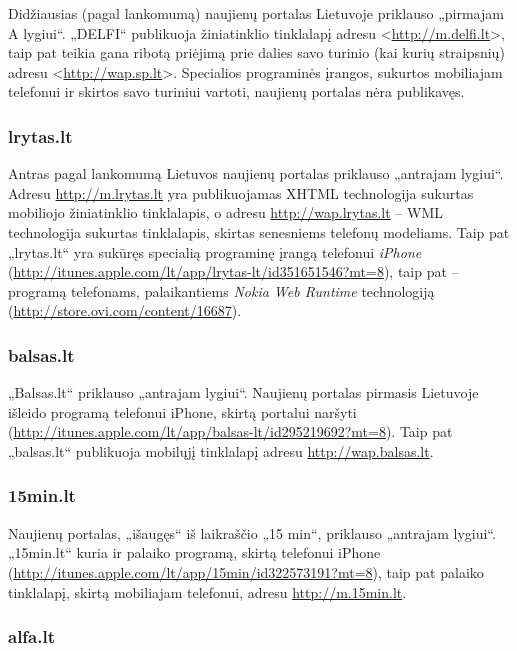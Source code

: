 \documentclass[kursinis-darbas]{vukf}
\begin{document}
Didžiausias (pagal lankomumą) naujienų portalas Lietuvoje priklauso „pirmajam A lygiui“. „DELFI“ publikuoja žiniatinklio tinklalapį adresu <\url{http://m.delfi.lt}>, taip pat teikia gana ribotą priėjimą prie dalies savo turinio (kai kurių straipsnių) adresu <\url{http://wap.sp.lt}>. Specialios programinės įrangos, sukurtos mobiliajam telefonui ir skirtos savo turiniui vartoti, naujienų portalas nėra publikavęs.

\subsubsection{lrytas.lt}

Antras pagal lankomumą Lietuvos naujienų portalas priklauso „antrajam lygiui“. Adresu \url{http://m.lrytas.lt} yra publikuojamas XHTML technologija sukurtas mobiliojo žiniatinklio tinklalapis, o adresu \url{http://wap.lrytas.lt} – WML technologija sukurtas tinklalapis, skirtas senesniems telefonų modeliams. Taip pat „lrytas.lt“ yra sukūręs specialią programinę įrangą telefonui \emph{iPhone} (\url{http://itunes.apple.com/lt/app/lrytas-lt/id351651546?mt=8}), taip pat – programą telefonams, palaikantiems \emph{Nokia Web Runtime} technologiją (\url{http://store.ovi.com/content/16687}).

\subsubsection{balsas.lt}

„Balsas.lt“ priklauso „antrajam lygiui“. Naujienų portalas pirmasis Lietuvoje išleido programą telefonui iPhone, skirtą portalui naršyti (\url{http://itunes.apple.com/lt/app/balsas-lt/id295219692?mt=8}). Taip pat „balsas.lt“ publikuoja mobilųjį tinklalapį adresu \url{http://wap.balsas.lt}.

\subsubsection{15min.lt}

Naujienų portalas, „išaugęs“ iš laikraščio „15 min“, priklauso „antrajam lygiui“. „15min.lt“ kuria ir palaiko programą, skirtą telefonui iPhone (\url{http://itunes.apple.com/lt/app/15min/id322573191?mt=8}), taip pat palaiko tinklalapį, skirtą mobiliajam telefonui, adresu \url{http://m.15min.lt}.

\subsubsection{alfa.lt}
\end{document}
